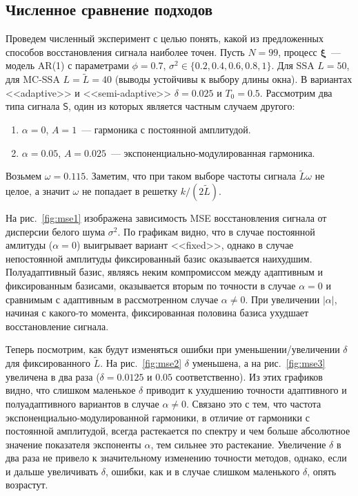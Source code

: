 \documentclass{math-mech-sci}
\begin{document}
\subsection*{Численное сравнение подходов}
Проведем численный эксперимент с целью понять, какой из предложенных способов восстановления сигнала наиболее точен. Пусть $N=99$, процесс $\bm\xi$~--- модель AR(1) с параметрами $\phi=0.7$, $\sigma^2\in\{0.2, 0.4, 0.6, 0.8, 1\}$. Для SSA $L=50$, для MC-SSA $L=\widetilde L=40$ (выводы устойчивы к выбору длины окна). В вариантах <<adaptive>> и <<semi-adaptive>> $\delta=0.025$ и $T_0=0.5$. Рассмотрим два типа сигнала $\mathsf{S}$, один из которых является частным случаем другого:
\begin{enumerate}
    \item $\alpha=0$, $A=1$~--- гармоника с постоянной амплитудой.
    \item $\alpha=0.05$, $A=0.025$~--- экспоненциально-модулированная гармоника.
\end{enumerate}
Возьмем $\omega=0.115$. Заметим, что при таком выборе частоты сигнала $\widetilde L \omega$ не целое, а значит $\omega$ не попадает в решетку $k/(2\widetilde L)$.

На рис.~\ref{fig:mse1} изображена зависимость MSE восстановления сигнала от дисперсии белого шума $\sigma^2$. По графикам видно, что в случае постоянной амлитуды ($\alpha=0$) выигрывает вариант <<fixed>>, однако в случае непостоянной амплитуды фиксированный базис оказывается наихудшим. Полуадаптивный базис, являясь неким компромиссом между адаптивным и фиксированным базисами, оказывается вторым по точности в случае $\alpha=0$ и сравнимым с адаптивным в рассмотренном случае $\alpha\ne0$. При увеличении $|\alpha|$, начиная с какого-то момента, фиксированная половина базиса ухудшает восстановление сигнала.

Теперь посмотрим, как будут изменяться ошибки при уменьшении/увеличении $\delta$ для фиксированного $\widetilde L$. На рис.~\ref{fig:mse2} $\delta$ уменьшена, а на рис.~\ref{fig:mse3} увеличена в два раза ($\delta=0.0125$ и $0.05$ соответственно). Из этих графиков видно, что слишком маленькое $\delta$ приводит к ухудшению точности адаптивного и полуадаптивного вариантов в случае $\alpha\ne0$. Связано это с тем, что частота экспоненциально-модулированной гармоники, в отличие от гармоники с постоянной амплитудой, всегда растекается по спектру и чем больше абсолютное значение показателя экспоненты $\alpha$, тем сильнее это растекание. Увеличение $\delta$ в два раза не привело к значительному изменению точности методов, однако, если и дальше увеличивать $\delta$, ошибки, как и в случае слишком маленького $\delta$, опять возрастут.
\end{document}
